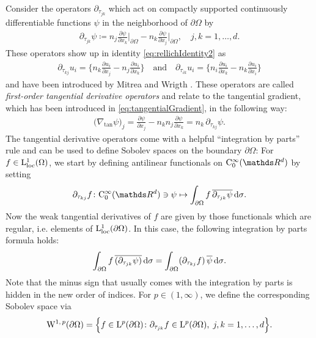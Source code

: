 Consider the operators $\partial_{\tau_{jk}}$ which act on compactly supported continuously differentiable functions $\psi$ in the neighborhood of $\partial\Omega$ by
\begin{align}
  \label{eq:defnTangDerivative}
  \partial_{\tau_{jk}} \psi \coloneqq n_j \frac{\partial \psi}{\partial x_k} \bigg|_{\partial\Omega} - n_k \frac{\partial \psi}{\partial x_j} \bigg|_{\partial\Omega}, \quad j,k = 1,\dots,d.
\end{align}
These operators show up in identity \eqref{eq:rellichIdentity2} as
\begin{align*}
  \partial_{\tau_{kj}} u_i = \Big\{ n_k \frac{\partial u_i}{\partial x_j} - n_j \frac{\partial u_i}{\partial x_k} \Big\}
  \quad\text{and}\quad
  \partial_{\tau_{ik}} u_i =  \Big\{ n_i \frac{\partial u_i}{\partial x_k} - n_k \frac{\partial u_i}{\partial x_i} \Big\}
\end{align*}
and have been introduced by Mitrea and Wrigth \cite[p. 16]{mitreaWright}. 
These operators are called \emph{first-order tangential derivative operators} and relate to the tangential gradient, which has been introduced in 
\eqref{eq:tangentialGradient}, in the following way:
\begin{align}
  \label{eq:relTanGrad}
  \big(\nabla_{\mathrm{tan}} \psi\big)_j = \frac{\partial \psi}{\partial x_j} - n_k n_j \frac{\partial \psi}{\partial x_k} = n_k \, \partial_{\tau_{kj}} \psi.
\end{align}
The tangential derivative operators come with a helpful  ``integration by parts'' rule and can be used to define Sobolev spaces on the boundary $\partial\Omega$:
For $f \in \mathrm{L}^1_{\mathrm{loc}}(\Omega)$, we start by defining antilinear functionals on $\CC_0^\infty(\R^d)$ by setting
\begin{align*}
    \partial_{\tau_{kj}} f \colon \CC_0^\infty(\R^d) \ni \psi \mapsto \int_{\partial\Omega} f \, \overline{ \partial_{\tau_{jk}} \psi} \d\sigma.
\end{align*}
Now the weak tangential derivatives of $f$ are given by those functionals which are regular, i.e. elements of $\mathrm{L}^1_{\mathrm{loc}}(\partial\Omega)$.
In this case, the following integration by parts formula holds:
\begin{align}
    \label{eq:intByPartsTang}
    \int_{\partial\Omega} f\, \overline{( \partial_{\tau_{jk}} \psi)} \, {\operatorname{d}\!{\sigma}} = \int_{\partial\Omega} (\partial_{\tau_{kj}} f)\, \overline{\psi} \, {\operatorname{d}\!{\sigma}}.
\end{align}
Note that the minus sign that usually comes with the integration by parts is hidden in the new order of indices.
For $p \in (1,\infty)$, we define the corresponding Sobolev space via
\begin{align*}
  \mathrm{W}^{1,\,p}(\partial\Omega) = \Big\{ f \in \mathrm{L}^p(\partial\Omega) \colon \partial_{\tau_{jk}} f \in \mathrm{L}^p(\partial\Omega), \; j,k = 1,\dots,d \Big\}.
\end{align*}

